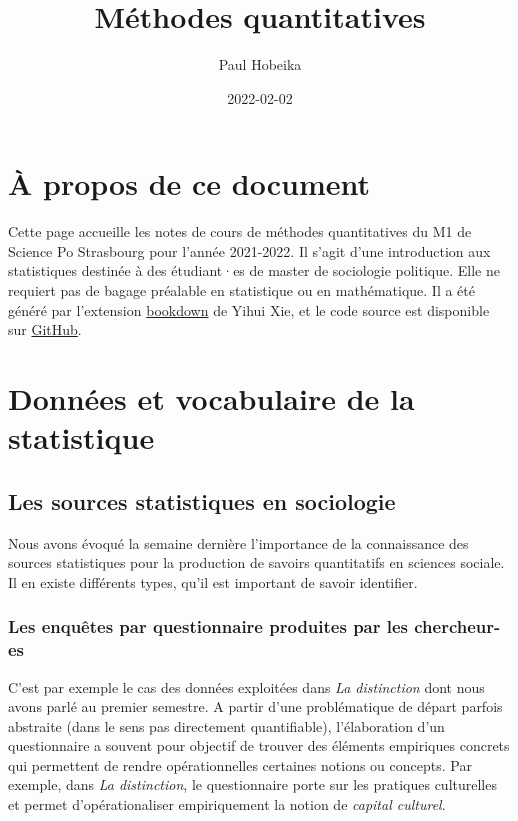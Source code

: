 \documentclass[
]{book}
\title{Méthodes quantitatives}
\author{Paul Hobeika}
\date{2022-02-02}
\begin{document}
\maketitle

{
\setcounter{tocdepth}{1}
\tableofcontents
}
\hypertarget{uxe0-propos-de-ce-document}{%
\chapter*{À propos de ce document}\label{uxe0-propos-de-ce-document}}

Cette page accueille les notes de cours de méthodes quantitatives du M1 de Science Po Strasbourg pour l'année 2021-2022. Il s'agit d'une introduction aux statistiques destinée à des étudiant·es de master de sociologie politique. Elle ne requiert pas de bagage préalable en statistique ou en mathématique. Il a été généré par l'extension \href{https://bookdown.org/}{bookdown} de Yihui Xie, et le code source est disponible sur \href{https://github.com/phobeika/quanti}{GitHub}.

\hypertarget{donnuxe9es-et-vocabulaire-de-la-statistique}{%
\chapter{Données et vocabulaire de la statistique}\label{donnuxe9es-et-vocabulaire-de-la-statistique}}

\hypertarget{les-sources-statistiques-en-sociologie}{%
\section{Les sources statistiques en sociologie}\label{les-sources-statistiques-en-sociologie}}

Nous avons évoqué la semaine dernière l'importance de la connaissance des sources statistiques pour la production de savoirs quantitatifs en sciences sociale. Il en existe différents types, qu'il est important de savoir identifier.

\hypertarget{les-enquuxeates-par-questionnaire-produites-par-les-chercheur-es}{%
\subsection{Les enquêtes par questionnaire produites par les chercheur-es}\label{les-enquuxeates-par-questionnaire-produites-par-les-chercheur-es}}

C'est par exemple le cas des données exploitées dans \emph{La distinction} \citep{bourdieu1979} dont nous avons parlé au premier semestre. A partir d'une problématique de départ parfois abstraite (dans le sens pas directement quantifiable), l'élaboration d'un questionnaire a souvent pour objectif de trouver des éléments empiriques concrets qui permettent de rendre opérationnelles certaines notions ou concepts. Par exemple, dans \emph{La distinction}, le questionnaire porte sur les pratiques culturelles et permet d'opérationaliser empiriquement la notion de \emph{capital culturel}.
\end{document}
